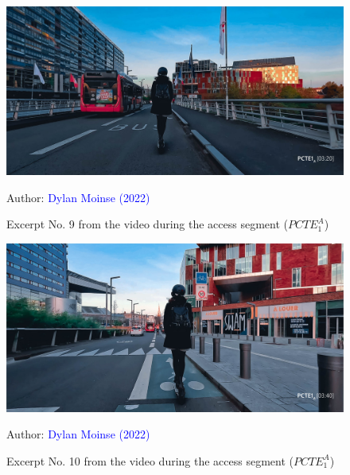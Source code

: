     \begin{figure}[h!]\vspace*{4pt}
        \caption*{Excerpt No. 9 from the video during the access segment (\(PCTE^{A}_{1}\))}
        \centerline{\includegraphics[width=0.75\columnwidth]{src/Figures/Annexes/Extrait_Video_PCTE1_Access_9.jpg}}
        \vspace{5pt}
        \begin{flushright}\scriptsize{
        Author: \textcolor{blue}{Dylan Moinse (2022)}
        }\end{flushright}
    \end{figure}

    \begin{figure}[h!]\vspace*{4pt}
        \caption*{Excerpt No. 10 from the video during the access segment (\(PCTE^{A}_{1}\))}
        \centerline{\includegraphics[width=0.75\columnwidth]{src/Figures/Annexes/Extrait_Video_PCTE1_Access_10.jpg}}
        \vspace{5pt}
        \begin{flushright}\scriptsize{
        Author: \textcolor{blue}{Dylan Moinse (2022)}
        }\end{flushright}
    \end{figure}
    
